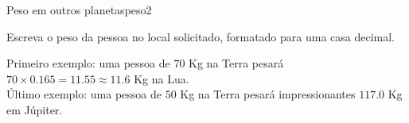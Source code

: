 \documentclass[12pt,a4paper,oneside]{article}
\begin{document}
\begin{problem}{Peso em outros planetas}{peso}{2}
\OutputFile

Escreva o peso da pessoa no local solicitado, formatado para uma casa decimal.


\Example

\begin{example}
%
\end{example}

\begin{example}
%
\end{example}

\begin{example}
%
\end{example}

\begin{example}
%
\end{example}

\small
Primeiro exemplo: uma pessoa de $70$ Kg na Terra pesará $70 \times 0.165 = 11.55 \approx 11.6$ Kg na Lua.\\
Último exemplo: uma pessoa de $50$ Kg na Terra pesará impressionantes $117.0$ Kg em Júpiter.

\end{problem}
\end{document}

